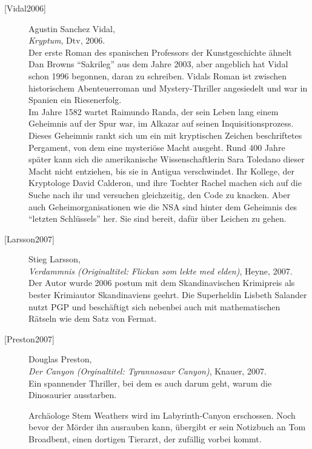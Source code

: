\begin{description}
\item[\textrm{[Vidal2006]}] 
    Agustin Sanchez Vidal, \\
    {\em Kryptum}, Dtv, 2006. \\
    Der erste Roman des spanischen Professors der Kunstgeschichte ähnelt
    Dan Browns "`Sakrileg"' aus dem Jahre 2003, aber angeblich hat Vidal schon
    1996 begonnen, daran zu schreiben. Vidals Roman ist zwischen historischem
    Abenteuerroman und Mystery-Thriller angesiedelt und war in Spanien ein
    Riesenerfolg.\\
    Im Jahre 1582 wartet Raimundo Randa, der sein Leben lang einem Geheimnis
    auf der Spur war, im Alkazar auf seinen Inquisitionsprozess.
    Dieses Geheimnis rankt sich um ein mit kryptischen Zeichen beschriftetes
    Pergament, von dem eine mysteriöse Macht ausgeht.
    Rund 400 Jahre später kann sich die amerikanische Wissenschaftlerin Sara
    Toledano dieser Macht nicht entziehen, bis sie in Antigua verschwindet.
    Ihr Kollege, der Kryptologe David Calderon, und ihre Tochter Rachel machen
    sich auf die Suche nach ihr und versuchen gleichzeitig, den Code zu knacken.
    Aber auch Geheimorganisationen wie die NSA sind hinter dem
    Geheimnis des "`letzten Schlüssels"' her. Sie sind bereit, dafür
    über Leichen zu gehen.\\


\item[\textrm{[Larsson2007]}] 
    Stieg Larsson, \\
    {\em Verdammnis (Originaltitel: Flickan som lekte med elden)}, Heyne, 2007. \\
    Der Autor wurde 2006 postum mit dem Skandinavischen Krimipreis als bester
    Krimiautor Skandinaviens geehrt. Die Superheldin Lisbeth Salander nutzt PGP
    und beschäftigt sich nebenbei auch mit mathematischen Rätseln wie dem Satz
    von Fermat.\\


\item[\textrm{[Preston2007]}] 
    Douglas Preston, \\
    {\em Der Canyon (Orginaltitel: Tyrannosaur Canyon)}, Knauer, 2007. \\
    Ein spannender Thriller, bei dem es auch darum geht, warum die Dinosaurier
    ausstarben.

    Archäologe Stem Weathers wird im Labyrinth-Canyon erschossen. Noch bevor der
    Mörder ihn ausrauben kann, übergibt er sein Notizbuch an Tom Broadbent, einen
    dortigen Tierarzt, der zufällig vorbei kommt.


\end{description}
